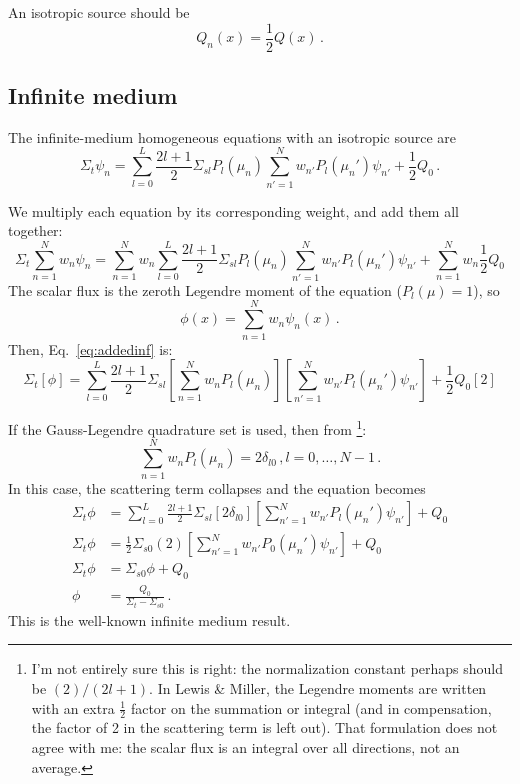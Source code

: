 \documentclass[]{SRJcommon}
\begin{document}
An isotropic source should be 
\begin{equation}
Q_n(x) = \frac{1}{2} Q(x) \,.
  \label{eq:isotropicsource}
\end{equation}

\subsection{Infinite medium}
The infinite-medium homogeneous \SN{} equations with an isotropic source are
$$\Sigma_t \psi_n 
= \sum_{l=0}^{L}  \frac{2l+1}{2} \Sigma_{sl} P_{l}(\mu_n)
  \sum_{n'=1}^{N} w_{n'} P_{l} (\mu_n') \psi_{n'}
  + \frac{1}{2} Q_0 \,.$$

We multiply each equation by its corresponding weight, and add them all
together:
\begin{equation}
\Sigma_t \sum_{n=1}^{N} w_{n} \psi_{n} 
= \sum_{n=1}^{N} w_{n} \sum_{l=0}^{L}  \frac{2l+1}{2} \Sigma_{sl} P_{l}(\mu_n)
  \sum_{n'=1}^{N} w_{n'} P_{l} (\mu_n') \psi_{n'}
  + \sum_{n=1}^{N} w_{n} \frac{1}{2} Q_0
  \label{eq:addedinf}
\end{equation}
The scalar flux is the zeroth Legendre moment of the equation ($P_l(\mu) = 1$),
so
$$ \phi(x) = \sum_{n=1}^{N} w_{n} \psi_{n}(x) \,.$$
Then, Eq.~\eqref{eq:addedinf} is:
$$ \Sigma_t [\phi] 
= \sum_{l=0}^{L}  \frac{2l+1}{2} \Sigma_{sl} \left[ \sum_{n=1}^{N} w_{n}
P_{l}(\mu_n) \right] \left[ \sum_{n'=1}^{N} w_{n'} P_{l} (\mu_n') \psi_{n'}
\right] + \frac{1}{2} Q_0 [2] $$

If the Gauss-Legendre quadrature set is used, then from
\cite[p.121]{Lew1984}\footnote{I'm not entirely sure this is right: the
normalization constant perhaps should be $(2)/(2l+1)$. In Lewis \& Miller,
the Legendre moments are written with an extra $\frac{1}{2}$ factor on the
summation or integral (and in compensation, the factor of 2 in the
scattering term is left out).  That formulation does not agree with me: the
scalar flux is an integral over all directions, not an average.}:
$$ \sum_{n=1}^{N} w_{n} P_{l}(\mu_n) = 2 \delta_{l0} \,, l = 0,\ldots, N-1 \,.$$
In this case, the scattering term collapses and the equation becomes
\begin{align*}
  \Sigma_t \phi 
  &= \sum_{l=0}^{L}  \frac{2l+1}{2} \Sigma_{sl} \left[ 2 \delta_{l0} \right] \left[ \sum_{n'=1}^{N} w_{n'} P_{l} (\mu_n') \psi_{n'}
\right] + Q_0
\\
  \Sigma_t \phi 
  &=  \frac{1}{2} \Sigma_{s0} (2) \left[ \sum_{n'=1}^{N} w_{n'} P_{0} (\mu_n') \psi_{n'}
\right] + Q_0
\\
\Sigma_t \phi 
  &=  \Sigma_{s0} \phi + Q_0
\\
\phi 
&=  \frac{Q_0}{\Sigma_t - \Sigma_{s0}} \,.
\end{align*}
This is the well-known infinite medium result.
\end{document}
